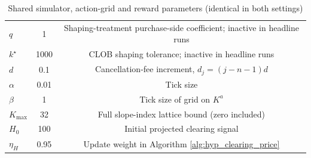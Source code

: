 \begin{table}[ht!]
\begin{tabular}{lcc}
$q$ & 1 & Shaping-treatment purchase-side coefficient; inactive in headline runs \\
$k^\star$ & 1000 & CLOB shaping tolerance; inactive in headline runs \\
$d$ & 0.1 & Cancellation-fee increment, $d_j=(j-n-1)d$ \\
$\alpha$ & 0.01 & Tick size \\
$\beta$ & 1 & Tick size of grid on $K^a$ \\
$K_\text{max}$ & 32 & Full slope-index lattice bound (zero included) \\
$H_0$ & 100 & Initial projected clearing signal \\
$\eta_H$ & 0.95 & Update weight in Algorithm \ref{alg:hyp_clearing_price}\\
\bottomrule
\end{tabular}
\caption{Shared simulator, action-grid and reward parameters (identical in both settings)}
\label{tab:params_generative}
\end{table}
